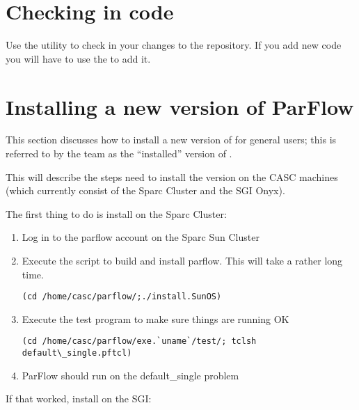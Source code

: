 \section{Checking in code}
\label{Checking in code}

Use the  utility to check in your changes to the
\parflow{} repository.  If you add new code you will have to use
the  to add it.


\section{Installing a new version of ParFlow}
\label{Installing a new version of ParFlow}

This section discusses how to install a new version of \parflow 
for general users; this is referred to by the \parflow team as the
``installed'' version of \parflow.

This will describe the steps need to install the version on the CASC
machines (which currently consist of the Sparc Cluster and the SGI
Onyx).

The first thing to do is install on the Sparc Cluster:

\begin{enumerate}
\item
Log in to the parflow account on the Sparc Sun Cluster
\item
Execute the script to build and install parflow.  This will take 
a rather long time.
\begin{display}\begin{verbatim}
(cd /home/casc/parflow/;./install.SunOS)
\end{verbatim}\end{display}
\item
Execute the test program to make sure things are running OK
\begin{display}\begin{verbatim}
(cd /home/casc/parflow/exe.`uname`/test/; tclsh default\_single.pftcl)
\end{verbatim}\end{display}
\item
ParFlow should run on the default\_single problem
\end{enumerate}

If that worked, install on the SGI:

